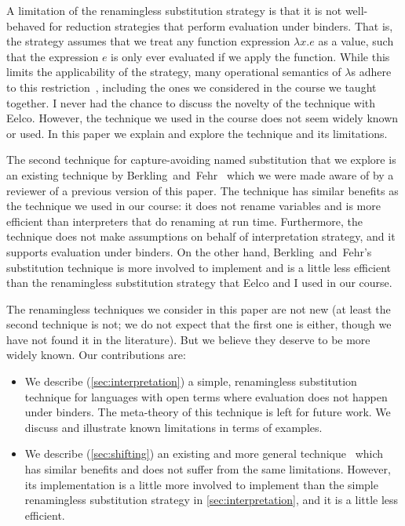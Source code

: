 A limitation of the renamingless substitution strategy is that it is not well-behaved for reduction strategies that perform evaluation under binders.
That is, the strategy assumes that we treat any function expression $\lambda x . e$ as a value, such that the expression $e$ is only ever evaluated if we apply the function.
While this limits the applicability of the strategy, many operational semantics of $\lambda$s adhere to this restriction~\cite{Landin64,DBLP:books/daglib/0069232,pierce2002types,reynolds98definitional}, including the ones we considered in the course we taught together.
I never had the chance to discuss the novelty of the technique with Eelco.
However, the technique we used in the course does not seem widely known or used.
In this paper we explain and explore the technique and its limitations.

The second technique for capture-avoiding named substitution that we explore is an existing technique by Berkling~and~Fehr~\cite{berkling1982amodification} which we were made aware of by a reviewer of a previous version of this paper.
The technique has similar benefits as the technique we used in our course: it does not rename variables and is more efficient than interpreters that do renaming at run time.
Furthermore, the technique does not make assumptions on behalf of interpretation strategy, and it supports evaluation under binders.
On the other hand, Berkling~and~Fehr's substitution technique is more involved to implement and is a little less efficient than the renamingless substitution strategy that Eelco and I used in our course.

The renamingless techniques we consider in this paper are not new (at least the second technique is not; we do not expect that the first one is either, though we have not found it in the literature).
But we believe they deserve to be more widely known.
Our contributions are:
\begin{itemize}

\item
  We describe (\cref{sec:interpretation}) a simple, renamingless substitution technique for languages with open terms where evaluation does not happen under binders.
  The meta-theory of this technique is left for future work.
  We discuss and illustrate known limitations in terms of examples.

\item
  We describe (\cref{sec:shifting}) an existing and more general technique~\cite{berkling1982amodification} which has similar benefits and does not suffer from the same limitations.
  However, its implementation is a little more involved to implement than the simple renamingless substitution strategy in \cref{sec:interpretation}, and it is a little less efficient.

\end{itemize}






